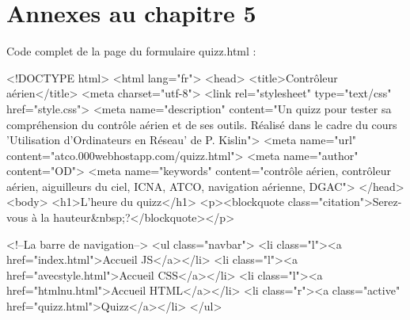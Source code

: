 \documentclass[11pt]{article}
\begin{document}
\section{Annexes au chapitre 5}

Code complet de la page du formulaire quizz.html :

\begin{code2}
<!DOCTYPE html>
<html lang="fr">
  	<head>
    	<title>Contrôleur aérien</title>
    	<meta charset="utf-8">
    	<link rel="stylesheet" type="text/css" href="style.css">
    	<meta name="description" content="Un quizz pour tester sa compréhension du contrôle aérien et de ses outils. Réalisé dans le cadre du cours 'Utilisation d'Ordinateurs en Réseau' de P. Kislin">
    	<meta name="url" content="atco.000webhostapp.com/quizz.html">
    	<meta name="author" content="OD">
    	<meta name="keywords" content="contrôle aérien, contrôleur aérien, aiguilleurs du ciel, ICNA, ATCO, navigation aérienne, DGAC">
  	</head>
  	<body>
  		<h1>L'heure du quizz</h1>
  		<p><blockquote class="citation">Serez-vous à la hauteur&nbsp;?</blockquote></p>

<!--La barre de navigation-->
  		<ul class="navbar">
			<li class="l"><a href="index.html">Accueil JS</a></li>
			<li class="l"><a href="avecstyle.html">Accueil CSS</a></li>
			<li class="l"><a href="htmlnu.html">Accueil HTML</a></li>
			<li class="r"><a class="active"  href="quizz.html">Quizz</a></li>
		</ul>\end{code2}
\end{document}
